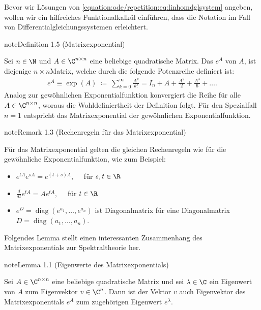 \documentclass[letterpaper,10pt,english]{jupyterBook}
\begin{document}
\sphinxAtStartPar
Bevor wir Lösungen von \eqref{equation:ode/repetition:eq:linhomdglsystem} angeben, wollen wir ein hilfreiches Funktionalkalkül einführen, dass die Notation im Fall von Differentialgleichungssystemen erleichtert.
\label{ode/repetition:definition-12}
\begin{sphinxadmonition}{note}{Definition 1.5 (Matrixexponential)}



\sphinxAtStartPar
Sei \(n \in \N\) und \(A \in \C^{n \times n}\) eine beliebige quadratische Matrix.
Das  \(e^A\) von \(A\), ist diejenige \(n\times n\)\sphinxhyphen{}Matrix, welche durch die folgende Potenzreihe definiert ist:
\begin{equation*}
\begin{split}e^A \equiv \exp(A) \ \coloneqq \ \sum_{k=0}^\infty \frac{A^k}{k!} = I_n + A + \frac{A^2}{2} + \frac{A^3}{6} + \ldots.\end{split}
\end{equation*}
\sphinxAtStartPar
Analog zur gewöhnlichen Exponentialfunktion konvergiert die Reihe für alle \(A \in \C^{n \times n}\), woraus die Wohldefiniertheit der Definition folgt.
Für den Spezialfall \(n=1\) entspricht das Matrixexponential der gewöhnlichen Exponentialfunktion.
\end{sphinxadmonition}
\label{ode/repetition:rem:matrixexponentialregeln}
\begin{sphinxadmonition}{note}{Remark 1.3 (Rechenregeln für das Matrixexponential)}



\sphinxAtStartPar
Für das Matrixexponential gelten die gleichen Rechenregeln wie für die gewöhnliche Exponentialfunktion, wie zum Beispiel:
\begin{itemize}
\item {} 
\sphinxAtStartPar
\(e^{tA}e^{sA} = e^{(t+s)A}, \quad\) für \(s,t \in \R\)

\item {} 
\sphinxAtStartPar
\(\frac{d}{dt} e^{tA} = Ae^{tA}, \quad\) für \(t \in \R\)

\item {} 
\sphinxAtStartPar
\( e^{D} = \operatorname{diag}(e^{a_1}, \ldots, e^{a_n})\) ist Diagonalmatrix für eine Diagonalmatrix \(D = \operatorname{diag}(a_1, \ldots, a_n)\).

\end{itemize}
\end{sphinxadmonition}

\sphinxAtStartPar
Folgendes Lemma stellt einen interessanten Zusammenhang des Matrixexponentials zur Spektraltheorie her.
\label{ode/repetition:lem:mpotew}
\begin{sphinxadmonition}{note}{Lemma 1.1 (Eigenwerte des Matrixexponentials)}



\sphinxAtStartPar
Sei \(A \in \C^{n\times n}\) eine beliebige quadratische Matrix und sei \(\lambda \in \C\) ein Eigenwert von \(A\) zum
Eigenvektor \(v \in \C^n\).
Dann ist der Vektor \(v\) auch Eigenvektor des Matrixexponentials \(e^A\) zum zugehörigen Eigenwert \(e^\lambda\).
\end{sphinxadmonition}
\end{document}
